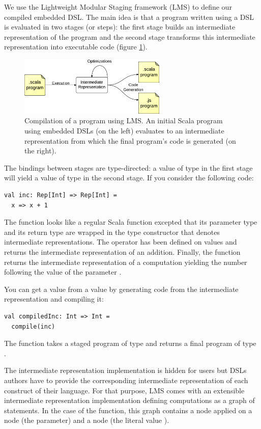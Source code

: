 \documentclass[runningheads,a4paper]{llncs}
\begin{document}
We use the Lightweight Modular Staging framework (LMS) to define our compiled embedded DSL. The main idea is that a
program written using a DSL is evaluated in two stages (or steps): the first stage builds an intermediate
representation of the program and the second stage transforms this intermediate representation into executable code
(figure \ref{lms-diagram}).

\begin{figure}
  \centering
  \includegraphics[width=7cm]{lms.pdf}
  \caption{Compilation of a program using LMS. An initial Scala program using embedded DSLs (on the left) evaluates
  to an intermediate representation from which the final program’s code is generated (on the right).}
  \label{lms-diagram}
\end{figure}

The bindings between stages are type-directed: a value of type  in the first stage will yield a value
of type  in the second stage. If you consider the following code:
\begin{lstlisting}
val inc: Rep[Int] => Rep[Int] =
  x => x + 1
\end{lstlisting}
The function looks like
a regular Scala function excepted that its parameter type and its return type are wrapped in the  type
constructor that denotes intermediate representations. The \code{+} operator has been defined on 
values and returns the intermediate representation of an addition. Finally, the  function returns the
intermediate representation of a computation yielding the number following the value of the parameter .

You can get a  value from a  value by generating code from the intermediate representation and
compiling it:
\begin{lstlisting}
val compiledInc: Int => Int =
  compile(inc)
\end{lstlisting}
The  function takes a staged program of type  and returns a final program of
type .

The intermediate representation implementation is hidden for users but DSLs authors have to provide the corresponding
intermediate representation of each construct of their language. For that purpose, LMS comes with an extensible
intermediate representation implementation defining computations as a graph of statements. In the case of the
 function, this graph contains a  node applied on a  node (the  parameter) and
a  node (the literal value ).
\end{document}
